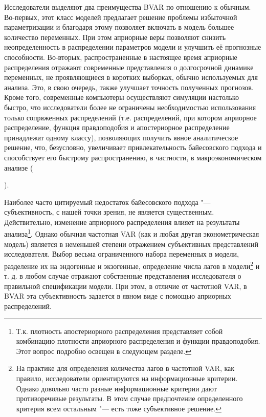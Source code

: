\documentclass[11pt]{article} %
\newcommand{\eng}[1]{\begin{otherlanguage}{english}#1\end{otherlanguage}}
\begin{document}
 Исследователи выделяют два преимущества BVAR по отношению к обычным. Во-первых, этот класс моделей предлагает решение проблемы избыточной параметризации и благодаря этому позволяет включать в модель большее количество переменных. При этом априорные веры позволяют снизить неопределенность в распределении параметров модели и улучшить её прогнозные способности. Во-вторых, распространенные в настоящее время  априорные распределения отражают современные представления о  долгосрочной динамике переменных, не проявляющиеся в коротких выборках, обычно используемых для анализа. Это, в свою очередь, также улучшает точность полученных прогнозов. Кроме того, современные компьютеры осуществляют симуляции настолько быстро, что исследователи  более не ограничены необходимостью использования только сопряженных распределений (т.е. распределений, при котором  априорное распределение, функция правдоподобия и апостериорное распределение принадлежат одному классу), позволяющих получить явное аналитическое решение, что, безусловно, увеличивает привлекательность байесовского подхода и способствует его быстрому распространению, в частности, в макроэкономическом анализе (\eng{\cite{karlsson_2012}}).


Наиболее часто цитируемый недостаток байесовского подхода "--- субъективность, с нашей точки зрения, не является существенным. Действительно, изменение априорного распределения влияет на  результаты анализа\footnote{Т.к. плотность апостериорного распределения представляет собой комбинацию плотности априорного распределения и функции правдоподобия. Этот вопрос подробно освещен в следующем разделе.}. Однако обычная частотная VAR (как и любая другая эконометрическая модель) является в неменьшей степени отражением субъективных представлений исследователя. Выбор весьма ограниченного набора переменных в модели, разделение их на эндогенные и экзогенные, определение числа лагов в модели\footnote{На практике для определения количества лагов в частотной VAR, как правило, исследователи ориентируются на информационные критерии. Однако довольно часто разные информационные критерии дают противоречивые результаты. В этом случае предпочтение определенного критерия всем остальным "--- есть тоже субъективное решение.} и т. д. в любом случае отражают собственные представления исследователя о правильной спецификации модели. При этом, в отличие от частотной VAR, в BVAR эта субъективность задается в явном виде с помощью априорных распределений.
\end{document}
